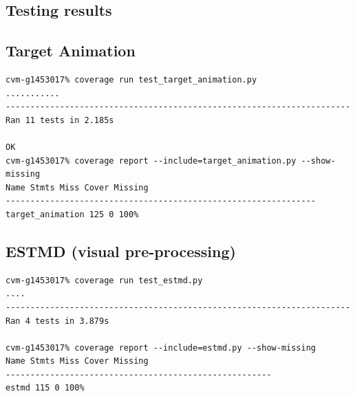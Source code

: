\documentclass[a4paper,11pt]{article}
\begin{document}
\begin{appendices}
\section{Testing results}
\subsection{Target Animation}
\begin{verbatim}
cvm-g1453017% coverage run test_target_animation.py
...........
----------------------------------------------------------------------
Ran 11 tests in 2.185s

OK
cvm-g1453017% coverage report --include=target_animation.py --show-missing
Name Stmts Miss Cover Missing
---------------------------------------------------------------
target_animation 125 0 100%
\end{verbatim}
\subsection{ESTMD (visual pre-processing)}
\begin{verbatim}
cvm-g1453017% coverage run test_estmd.py
....
----------------------------------------------------------------------
Ran 4 tests in 3.879s

cvm-g1453017% coverage report --include=estmd.py --show-missing
Name Stmts Miss Cover Missing
------------------------------------------------------
estmd 115 0 100% 
\end{verbatim}
\end{appendices}
\end{document}
